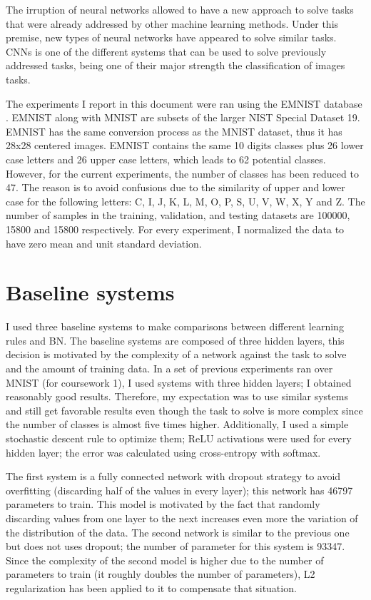 \documentclass{article}
\begin{document}
The irruption of neural networks allowed to have a new approach to solve tasks that were already addressed by other machine learning methods. Under this premise, new types of neural networks have appeared to solve similar tasks. CNNs is one of the different systems that can be used to solve previously addressed tasks, being one of their major strength the classification of images tasks.

The experiments I report in this document were ran using the EMNIST database \citep{cohen2017emnist}. EMNIST along with MNIST are subsets of the larger NIST Special Dataset 19. EMNIST has the same conversion process as the MNIST dataset, thus it has 28x28 centered images. EMNIST contains the same 10 digits classes plus 26 lower case letters and 26 upper case letters, which leads to 62 potential classes. However, for the current experiments, the number of classes has been reduced to 47. The reason is to avoid confusions due to the similarity of upper and lower case for the following letters: C, I, J, K, L, M, O, P, S, U, V, W, X, Y and Z. The number of samples in the training, validation, and testing datasets are 100000, 15800 and 15800 respectively. For every experiment, I normalized the data to have zero mean and unit standard deviation.

\section{Baseline systems} 
I used three baseline systems to make comparisons between different learning rules and BN. The baseline systems are composed of three hidden layers, this decision is motivated by the complexity of a network against the task to solve and the amount of training data. In a set of previous experiments ran over MNIST (for coursework 1), I used systems with three hidden layers; I obtained reasonably good results. Therefore, my expectation was to use similar systems and still get favorable results even though the task to solve is more complex since the number of classes is almost five times higher. Additionally, I used a simple stochastic descent rule to optimize them; ReLU activations were used for every hidden layer; the error was calculated using cross-entropy with softmax.

The first system is a fully connected network with dropout strategy to avoid overfitting (discarding half of the values in every layer); this network has 46797 parameters to train. This model is motivated by the fact that randomly discarding values from one layer to the next increases even more the variation of the distribution of the data. The second network is similar to the previous one but does not uses dropout; the number of parameter for this system is 93347. Since the complexity of the second model is higher due to the number of parameters to train (it roughly doubles the number of parameters), L2 regularization has been applied to it to compensate that situation. 
\end{document}
